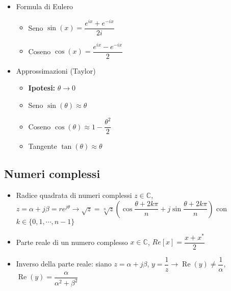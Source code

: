 \documentclass{article}
\begin{document}
\begin{itemize}
\begin{itemize}
	\end{itemize}
	\item Formula di Eulero
	\begin{itemize}
		\item Seno \(\sin(x) = \dfrac{e^{ix} + e^{-ix}}{2i} \)
		\item Coseno \(\cos(x) = \dfrac{e^{ix} - e^{-ix}}{2} \)
	\end{itemize}
	\item Approssimazioni (Taylor)
	\begin{itemize}
		\item \textbf{Ipotesi:} \( \theta \rightarrow 0 \)
		\item Seno \( \sin(\theta) \approx \theta \)
		\item Coseno \( \cos(\theta) \approx 1 - \dfrac{\theta^2}{2} \)
		\item Tangente \( \tan(\theta) \approx \theta\)
	\end{itemize}
\end{itemize}

\subsection{Numeri complessi}
\begin{itemize}
	\item Radice quadrata di numeri complessi \(z \in \mathbb{C}\), \\ \( z = \alpha + j \beta = r e^{j \theta} \rightarrow \sqrt{z} = \sqrt[n]{z} \left( \cos{\dfrac{\theta + 2k\pi}{n}} + j \sin{\dfrac{\theta + 2 k \pi}{n}} \right) \) \newline con \(k \in \{0, 1, \cdots, n-1 \} \)
	\item Parte reale di un numero complesso \(x \in \mathbb{C}\), \(Re[x] = \dfrac{x + x^{*}}{2} \)
	\item Inverso della parte reale: siano \(z = \alpha + j \beta \), \(y = \dfrac{1}{z} \rightarrow \operatorname{Re}(y) \neq \dfrac{1}{\alpha}\), \(\operatorname{Re}(y)  = \dfrac{\alpha}{\alpha^2 + \beta^2}\)
\end{itemize}
\end{document}
